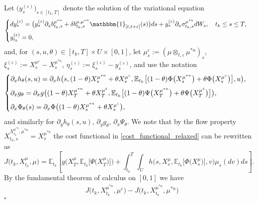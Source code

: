 \documentclass[12pt]{article}
\theoremstyle{named}
\numberwithin{equation}{section}
\newenvironment{Proof}{\removelastskip\par\medskip \noindent{\em Proof.} \rm}{\penalty-20\null\hfill$\square$\par\medbreak}
\begin{document}
\begin{Proof}
  Let $\big( y^{(\varepsilon)}_s\big)_{s\in [t_k , T]}$ denote the solution of the variational equation
\begin{equation}
\label{variational k}
\begin{cases}
    dy^{(\varepsilon)}_s = \bigl(y^{( \varepsilon )}_s\partial_xb^{\mu^{*n} }_{t_k ,s}  + \delta b^{\mu,\mu^{*n} }_{t_k ,s} \mathbbm{1}_{[t, t+\varepsilon]}(s)\bigr) ds + y^{(\varepsilon )}_s\partial_x \sigma^{\mu^{*n} }_{t_k ,s}  dW_s, \quad t_k  \leq s \leq T,
\medskip
\\
y^{(\varepsilon)}_{t_k } = 0,
\end{cases}
\end{equation}
and, for $ (s, u, \theta) \in [t_k,T] \times U \times [0,1] $, let
$\mu^\varepsilon_s := ( \mu \otimes_{t,\varepsilon} \mu^{*n} )_s$,
$\xi^{(\varepsilon)}_s := X^{\mu^\varepsilon}_s - X^{\mu^{*n}}_s$,
$\eta^{(\varepsilon)}_s := \xi^{(\varepsilon)}_s - y^{(\varepsilon)}_s$,
and use the notation
$$
  \begin{cases}
     \partial_x h_{\theta}(s,u) = \partial_x h\big(s, (1-\theta)X^{\mu^{*n}}_s + \theta X^{\mu^\varepsilon}_s
    , \mathbb{E}_{t_k }\big[(1-\theta) \Phi\big(X^{\mu^{*n}}_s\big) + \theta \Phi\big(X^{\mu^\varepsilon}_s\big)\big], u\big),
     \medskip
     \\
 \partial_xg_\theta
 = \partial_x g\big((1-\theta)X^{\mu^{*n}}_T + \theta X^{\mu^\varepsilon}_T
 , \mathbb{E}_{t_k }\big[(1-\theta) \Psi\big(X^{\mu^{*n}}_T\big) + \theta \Psi\big(X^{\mu^\varepsilon}_T\big)\big]\big),
 \medskip
 \\
 \partial_x\Phi_\theta(s)
 = \partial_x \Phi\big( (1-\theta)X^{\mu^{*n}}_s + \theta X^{\mu^\varepsilon}_s\big),
  \end{cases}
  $$
and similarly for
$\partial_yh_\theta(s,u)$,
$\partial_yg_\theta$,
$\partial_x\Psi_\theta$.
We note that by the flow property
$X^{X^{\mu^{*n} }_{t_k}, \mu^{*n}}_{t_k,s} = X^{\mu^{*n} }_s$ the cost functional
in \eqref{cost_functional_relaxed}
 can be rewritten as
$$
J\big(t_k ,X^\mu_{t_k }, \mu \big)
 = \mathbb{E}_{t_k}\left[
   g\big(X^\mu_T, \mathbb{E}_{t_k} \big[\Psi\big( X^\mu_T\big)\big]
   \big)
   +
   \int_{t_k}^T \int_U h\big(s, X^\mu_s, \mathbb{E}_{t_k}\big[\Phi\big( X^\mu_s\big) \big], v\big) \mu_s (dv) ds
   \right].
$$
 By the fundamental theorem of calculus on $[0,1]$
 we have
\begin{align}
  &J\big(t_k ,X^{\mu^{*n} }_{t_k },\mu^\varepsilon \big) - J\big(t_k ,X^{\mu^{*n}}_{t_k}, \mu^{*n} \big)
  \nonumber

\end{align}
\end{Proof}
\end{document}
